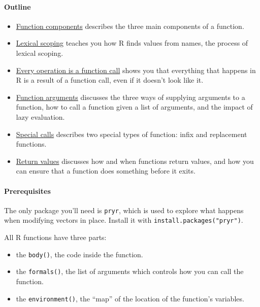 \paragraph{Outline}

\begin{itemize}
\item
  \hyperref[function-components]{Function components} describes the
  three main components of a function.
\item
  \hyperref[lexical-scoping]{Lexical scoping} teaches you how R finds
  values from names, the process of lexical scoping.
\item
  \hyperref[all-calls]{Every operation is a function call} shows you
  that everything that happens in R is a result of a function call, even
  if it doesn't look like it.
\item
  \hyperref[function-arguments]{Function arguments} discusses the three
  ways of supplying arguments to a function, how to call a function
  given a list of arguments, and the impact of lazy evaluation.
\item
  \hyperref[special-calls]{Special calls} describes two special types of
  function: infix and replacement functions.
\item
  \hyperref[return-values]{Return values} discusses how and when
  functions return values, and how you can ensure that a function does
  something before it exits.
\end{itemize}

\paragraph{Prerequisites}

The only package you'll need is \texttt{pryr}, which is used to explore
what happens when modifying vectors in place. Install it with
\texttt{install.packages("pryr")}.


All R functions have three parts: 
 

\begin{itemize}
\item
  the \texttt{body()}, the code inside the function.
\item
  the \texttt{formals()}, the list of arguments which controls how you
  can call the function.
\item
  the \texttt{environment()}, the ``map'' of the location of the
  function's variables.
\end{itemize}

